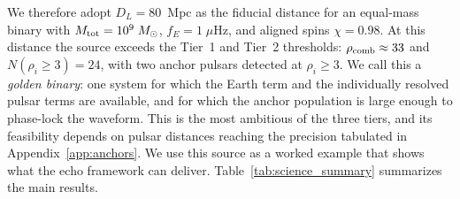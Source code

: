 \documentclass[aps,prx,twocolumn,superscriptaddress,nofootinbib,longbibliography]{revtex4-2}
\newcommand{\Msun}{M_\odot}
\begin{document}
We therefore adopt $D_L=80$~Mpc as the fiducial distance for an equal-mass binary with $M_{\rm tot}=10^9\;\Msun$, $f_E=1\;\mu$Hz, and aligned spins $\chi=0.98$. At this distance the source exceeds the Tier~1 and Tier~2 thresholds: $\rho_{\rm comb}\approx33$ and $N(\rho_i\ge3)=24$, with two anchor pulsars detected at $\rho_i\ge3$. We call this a \emph{golden binary}: one system for which the Earth term and the individually resolved pulsar terms are available, and for which the anchor population is large enough to phase-lock the waveform. This is the most ambitious of the three tiers, and its feasibility depends on pulsar distances reaching the precision tabulated in Appendix~\ref{app:anchors}. We use this source as a worked example that shows what the echo framework can deliver. Table~\ref{tab:science_summary} summarizes the main results.
\end{document}
